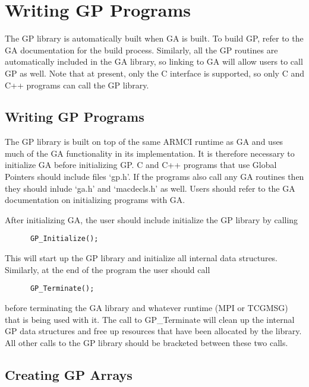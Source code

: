 \chapter{Writing GP Programs}

The GP library is automatically built when GA is built. To build GP, refer to
the GA documentation for the build process. Similarly, all the GP routines are
automatically included in the GA library, so linking to GA will allow users to
call GP as well. Note that at present, only the C interface is supported, so
only C and C++ programs can call the GP library.

\section{Writing GP Programs}

The GP library is built on top of the same ARMCI runtime as GA and uses much of
the GA functionality in its implementation. It is therefore necessary to
initialize GA before initializing GP. C and C++ programs that use Global Pointers should
include files `gp.h'. If the programs also call any GA routines then they
should inlude `ga.h' and `macdecls.h' as well. Users should refer
to the GA documentation on initializing programs with GA.

After initializing GA, the user should include initialize the GP library by
calling

\begin{verbatim}
      GP_Initialize();
\end{verbatim}

\noindent
This will start up the GP library and initialize all internal data structures.
Similarly, at the end of the program the user should call

\begin{verbatim}
      GP_Terminate();
\end{verbatim}

\noindent
before terminating the GA library and whatever runtime (MPI or TCGMSG) that is
being used with it. The call to GP\_Terminate will clean up the internal GP data
structures and free up resources that have been allocated by the library. All
other calls to the GP library should be bracketed between these two calls.

\section{Creating GP Arrays}

